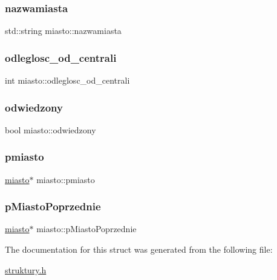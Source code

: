 \subsubsection{\texorpdfstring{nazwamiasta}{nazwamiasta}}
{\footnotesize\ttfamily std\+::string miasto\+::nazwamiasta}

\mbox{\label{structmiasto_a0c3b5abe9b7ab0df2ceb80f9bd3faec3}} 
\subsubsection{\texorpdfstring{odleglosc\+\_\+od\+\_\+centrali}{odleglosc\_od\_centrali}}
{\footnotesize\ttfamily int miasto\+::odleglosc\+\_\+od\+\_\+centrali}

\mbox{\label{structmiasto_a7a2028174edb36e184c06d084d02ef27}} 
\subsubsection{\texorpdfstring{odwiedzony}{odwiedzony}}
{\footnotesize\ttfamily bool miasto\+::odwiedzony}

\mbox{\label{structmiasto_a9cd7b8d4e3e00ba833d3149b76a918f9}} 
\subsubsection{\texorpdfstring{pmiasto}{pmiasto}}
{\footnotesize\ttfamily \mbox{\hyperlink{structmiasto}{miasto}}$\ast$ miasto\+::pmiasto}

\mbox{\label{structmiasto_a8238eaa6785b35e180170ae00996e515}} 
\subsubsection{\texorpdfstring{p\+Miasto\+Poprzednie}{pMiastoPoprzednie}}
{\footnotesize\ttfamily \mbox{\hyperlink{structmiasto}{miasto}}$\ast$ miasto\+::p\+Miasto\+Poprzednie}



The documentation for this struct was generated from the following file\+:\begin{DoxyCompactItemize}
\item 
\mbox{\hyperlink{struktury_8h}{struktury.\+h}}\end{DoxyCompactItemize}
